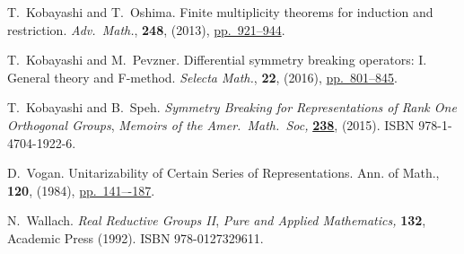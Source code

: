 \documentclass[reqno,12pt]{pja00} %
\theoremstyle{definition}
\theoremstyle{exampstyle} \newtheorem{examp}[theorem]{Theorem}
\begin{document}
\begin{thebibliography}{99}
T.~Kobayashi and T.~Oshima.
\newblock Finite multiplicity theorems for induction and restriction.
\newblock \emph{{\normalfont Adv.~Math.}}, \textbf{248}, (2013), 
 \href{http://dx.doi.org/10.1016/j.aim.2013.07.015}{pp.~921--944}.

T.~Kobayashi and M.~Pevzner.
\newblock Differential symmetry breaking operators: I. {G}eneral theory and
  {F}-method.
\newblock \emph{{\normalfont Selecta Math.}}, \textbf{22}, (2016),
\href{http://dx.doi.org/10.1007/s00029-015-0207-9}{pp.~801--845}.

T.~Kobayashi and B.~Speh.
\newblock \emph{Symmetry {B}reaking for {R}epresentations of {R}ank {O}ne
  {O}rthogonal {G}roups}, \emph{{\normalfont Memoirs of the Amer.~Math.~Soc},}
  \textbf{\href{http://dx.doi.org/10.1090/memo/1126}{238}}, (2015).
\newblock ISBN 978-1-4704-1922-6.

D.~Vogan. 
\newblock Unitarizability of Certain Series of Representations.
\newblock Ann. of Math., \textbf{120}, (1984), \href{www.jstor.org/stable/2007074}{pp.~141–-187}.


N.~Wallach.
\newblock \emph{Real Reductive Groups II}, \emph{{\normalfont Pure and Applied
  Mathematics},} \textbf{132},
\newblock Academic {P}ress (1992).
\newblock ISBN 978-0127329611.

\end{thebibliography}
\end{document}
